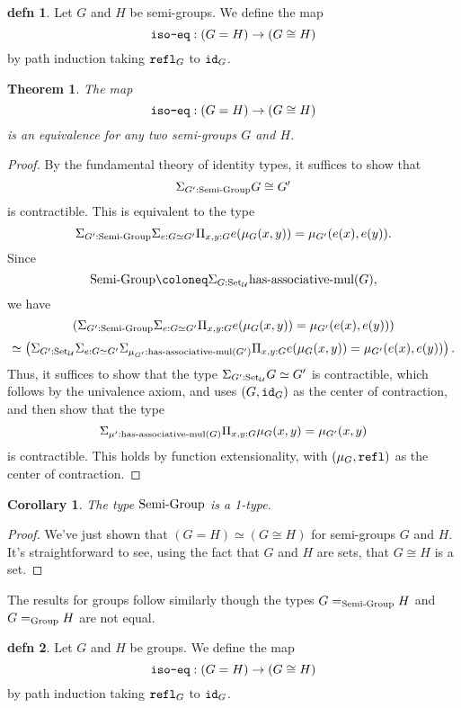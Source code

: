 \documentclass{amsart}
\theoremstyle{theorem}
\newtheorem*{thm}{Theorem}
\newtheorem*{cor}{Corollary}
\theoremstyle{definition}
\newtheorem*{defn}{defn}
\theoremstyle{remark}
\newcommand{\0}{\mathbbe{0}}
\newcommand{\1}{\mathbbe{1}}
\newcommand{\2}{\mathbbe{2}}
\newcommand{\3}{\mathbbe{3}}
\newcommand{\4}{\mathbbe{4}}
\newcommand{\term}[1]{{\textup{\texttt{#1}}}}
\newcommand{\type}[1]{{\textup{#1}}}
\newcommand{\id}{\term{id}}
\newcommand{\refl}{\term{refl}}
\newcommand{\UU}{{\mathcal{U}}}
\newcommand{\Set}{\type{Set}_{\UU}}
\begin{document}
\begin{defn} Let $G$ and $H$ be semi-groups. We define the map
\[
\term{iso-eq} : (G=H) \to (G \cong H)\]
by path induction taking $\refl_G$ to $\id_G$. 
\end{defn}

\begin{thm} The map 
\[
\term{iso-eq} : (G=H) \to (G \cong H)\]
is an equivalence for any two semi-groups $G$ and $H$.
\end{thm}
\begin{proof}
By the fundamental theory of identity types, it suffices to show that 
\[ \Sigma_{G' : \type{Semi-Group}} G \cong G'\]
is contractible. This is equivalent to the type
\[ \Sigma_{G' : \type{Semi-Group}} \Sigma_{e: G \simeq G'} \Pi_{x,y: G} e(\mu_G(x,y)) = \mu_{G'}(e(x),e(y)).\]
Since
\[ \type{Semi-Group} \coloneq \Sigma_{G: \Set} \type{has-associative-mul}(G),\]
we have
\[ \left( \Sigma_{G' : \type{Semi-Group}} \Sigma_{e: G \simeq G'} \Pi_{x,y: G} e(\mu_G(x,y)) = \mu_{G'}(e(x),e(y)) \right) \] \[\simeq \left( \Sigma_{G' : \Set} \Sigma_{e : G \simeq G'} \Sigma_{ \mu_{G'} : \type{has-associative-mul}(G')}\Pi_{x,y: G} e(\mu_G(x,y)) = \mu_{G'}(e(x),e(y)) \right). \]
Thus, it suffices to show that the type 
$\Sigma_{G' : \Set} G \simeq G'$
is contractible, which follows by the univalence axiom, and uses $(G,\id_G)$ as the center of contraction, and then show that the type
\[ \Sigma_{\mu' : \type{has-associative-mul}(G)} \Pi_{x,y: G} \mu_G(x,y) = \mu_{G'}(x,y)\] is contractible. This holds by function extensionality, with $(\mu_G, \refl)$ as the center of contraction.
\end{proof}

\begin{cor} The type $\type{Semi-Group}$ is a 1-type.
\end{cor}
\begin{proof}
We've just shown that $(G=H) \simeq (G \cong H)$ for semi-groups $G$ and $H$. It's straightforward to see, using the fact that $G$ and $H$ are sets, that $G \cong H$ is a set.
\end{proof}

The results for groups follow similarly though the types $G =_{\type{Semi-Group}} H$ and $G =_{\type{Group}} H$ are not equal. 

\begin{defn} Let $G$ and $H$ be groups. We define the map
\[
\term{iso-eq} : (G=H) \to (G \cong H)\]
by path induction taking $\refl_G$ to $\id_G$. 
\end{defn}
\end{document}
